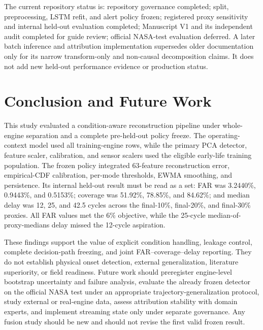 \documentclass[11pt]{article}
\begin{document}
The current repository status is: repository governance completed; split, preprocessing, LSTM refit, and alert policy frozen; registered proxy sensitivity and internal held-out evaluation completed; Manuscript V1 and its independent audit completed for guide review; official NASA-test evaluation deferred. A later batch inference and attribution implementation supersedes older documentation only for its narrow transform-only and non-causal decomposition claims. It does not add new held-out performance evidence or production status.


\section{Conclusion and Future Work}


This study evaluated a condition-aware reconstruction pipeline under whole-engine separation and a complete pre-held-out policy freeze. The operating-context model used all training-engine rows, while the primary PCA detector, feature scaler, calibration, and sensor scalers used the eligible early-life training population. The frozen policy integrated 63-feature reconstruction error, empirical-CDF calibration, per-mode thresholds, EWMA smoothing, and persistence. Its internal held-out result must be read as a set: FAR was 3.2440\%, 0.9443\%, and 0.5153\%; coverage was 51.92\%, 78.85\%, and 84.62\%; and median delay was 12, 25, and 42.5 cycles across the final-10\%, final-20\%, and final-30\% proxies. All FAR values met the 6\% objective, while the 25-cycle median-of-proxy-medians delay missed the 12-cycle aspiration.


These findings support the value of explicit condition handling, leakage control, complete decision-path freezing, and joint FAR--coverage--delay reporting. They do not establish physical onset detection, external generalization, literature superiority, or field readiness. Future work should preregister engine-level bootstrap uncertainty and failure analysis, evaluate the already frozen detector on the official NASA test under an appropriate trajectory-generalization protocol, study external or real-engine data, assess attribution stability with domain experts, and implement streaming state only under separate governance. Any fusion study should be new and should not revise the first valid frozen result.




\end{document}
